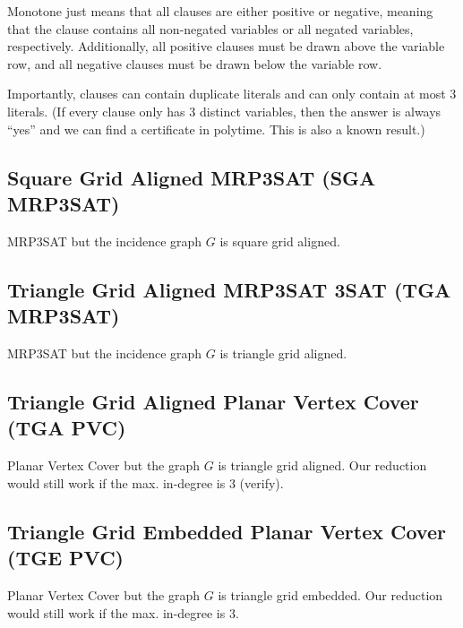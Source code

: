 Monotone just means that all clauses are either positive or negative, 
meaning that the clause contains all non-negated variables or all negated variables, respectively.
Additionally, all positive clauses must be drawn above the variable row, and all negative clauses must be drawn below the variable row.

Importantly, clauses can contain duplicate literals and can only contain at most 3 literals.
(If every clause only has 3 distinct variables, then the answer is always ``yes'' and we can find a certificate in polytime.
This is also a known result.)

\subsection{Square Grid Aligned MRP3SAT (SGA MRP3SAT)}

MRP3SAT but the incidence graph $G$ is square grid aligned.

\subsection{Triangle Grid Aligned MRP3SAT 3SAT (TGA MRP3SAT)}

MRP3SAT but the incidence graph $G$ is triangle grid aligned.

\subsection{Triangle Grid Aligned Planar Vertex Cover (TGA PVC)}

Planar Vertex Cover but the graph $G$ is triangle grid aligned.
Our reduction would still work if the max. in-degree is 3 (verify).

\subsection{Triangle Grid Embedded Planar Vertex Cover (TGE PVC)}

Planar Vertex Cover but the graph $G$ is triangle grid embedded.
Our reduction would still work if the max. in-degree is 3.


